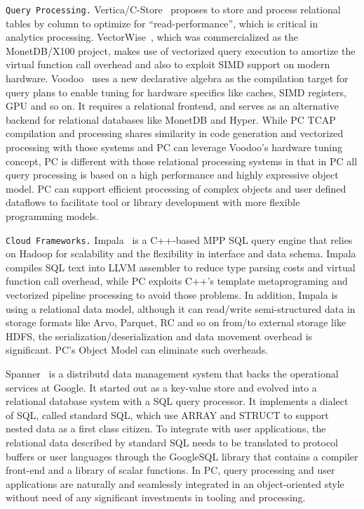 \vspace{5pt} 
\texttt{Query Processing.} Vertica/C-Store~\cite{stonebraker2005c} proposes
to store and process relational tables by
column to optimize for ``read-performance'', which is critical in
analytics processing.
VectorWise~\cite{zukowski2012vectorwise}, which was commercialized as the MonetDB/X100 project, makes use of
vectorized query execution to amortize the virtual function call overhead and also to exploit SIMD support
on modern hardware. Voodoo~\cite{pirk2016voodoo} uses a new
declarative algebra as the compilation target for query plans to
enable tuning for hardware specifics like caches, SIMD registers,
GPU and so on. It requires a relational frontend, and serves as an alternative backend for
relational databases like MonetDB and Hyper. While PC TCAP compilation
and processing shares
similarity in
code generation and vectorized processing with those
systems and PC can leverage Voodoo's hardware tuning concept, PC is
different with those relational processing systems in that in PC all query processing
is based on a high performance and highly expressive object model.
PC can support efficient
processing of complex objects and user defined
dataflows to facilitate tool or library development with more flexible
programming models.

\vspace{5pt} 
\texttt{Cloud Frameworks.} Impala~\cite{bittorf2015impala} is a
C++-based MPP
SQL query engine that relies on Hadoop for scalability and the
flexibility in interface and data schema. Impala compiles SQL text
into LLVM assembler to reduce type parsing costs and virtual function
call overhead, while PC exploits C++'s template metaprograming and
vectorized pipeline processing to avoid those problems. In addition,
Impala is using a relational data model, although it can read/write
semi-structured data in storage formats like Arvo, Parquet, RC and so
on from/to external storage like HDFS, the
serialization/deserialization and data movement overhead is
significant. PC's Object Model can eliminate such overheads.

Spanner~\cite{bacon2017spanner} is a
distributd data management system that backs the operational services
at Google. It started out as a key-value store and evolved into a
relational database system with a SQL query processor. It implements a
dialect of SQL, called standard SQL, which use ARRAY and STRUCT to
support nested data as a first class citizen. To integrate
with user applications, the relational data described by standard SQL needs to
be translated to protocol buffers or user languages through the
GoogleSQL library that contains a compiler front-end and a library of
scalar functions. In PC, query processing and user applications are
naturally and
seamlessly integrated in an object-oriented style without need of any
significant investments in tooling and processing.

